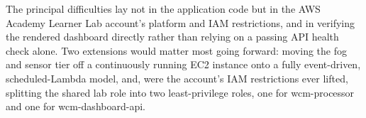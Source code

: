 \documentclass[conference,a4paper]{IEEEtran}
\begin{document}
The principal difficulties lay not in the application code but in the AWS Academy Learner Lab account's platform and IAM restrictions, and in verifying the rendered dashboard directly rather than relying on a passing API health check alone. Two extensions would matter most going forward: moving the fog and sensor tier off a continuously running EC2 instance onto a fully event-driven, scheduled-Lambda model, and, were the account's IAM restrictions ever lifted, splitting the shared lab role into two least-privilege roles, one for wcm-processor and one for wcm-dashboard-api.



\end{document}
